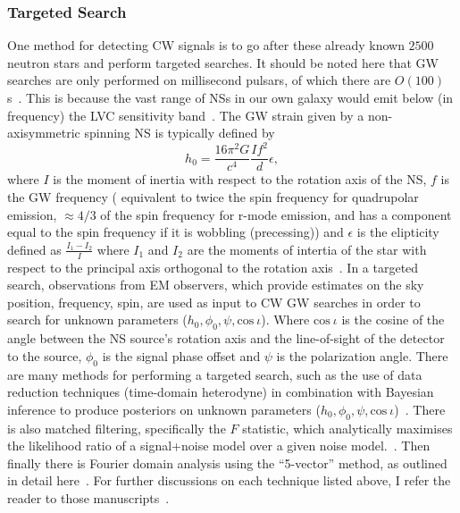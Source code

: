 \subsubsection{Targeted Search}
One method for detecting 
\ac{CW} signals is to go after these already known $2500$ neutron 
stars and perform targeted searches. It should be noted here 
that \ac{GW} searches are only performed on millisecond pulsars, of which 
there are $O(100)$s~\cite{1712.05897}. This is because the vast 
range of \ac{NS}s in our own galaxy would emit below 
(in frequency) the \ac{LVC} sensitivity band~\cite{2020ApJ...902L..21A}.
The GW strain given by a non-axisymmetric spinning 
\ac{NS} is typically defined by 
%
\begin{equation}
    h_{0} = \frac{16\pi^2G}{c^4} \frac{I f^2}{d} \epsilon,
\end{equation}
%
where $I$ is the moment of inertia with respect to the rotation axis 
of the \ac{NS}, $f$ is the \ac{GW} frequency (
equivalent to twice the spin frequency for quadrupolar emission, 
$\approx 4/3$ of the spin frequency for r-mode emission, and has a 
component equal to the spin frequency if it is wobbling (precessing)) 
and $\epsilon$ is the elipticity 
defined as $\frac{I_1 - I_2}{I}$ where $I_1$ and $I_2$ are the moments 
of intertia of the star with respect to the principal axis orthogonal to the 
rotation axis~\cite{1998PhRvD..58f3001J}. In a targeted search, observations 
from \ac{EM} observers, which provide estimates on the sky position, 
frequency, spin, are used as input to \ac{CW} \ac{GW} searches in order to 
search for unknown parameters ($h_0,\phi_0,\psi,\mathrm{cos} \ \iota$).
Where $\mathrm{cos} \ \iota$ is the cosine of the angle between the \ac{NS} 
source's rotation axis and the line-of-sight of the detector to the 
source, $\phi_0$ is the signal phase offset and $\psi$ is the polarization 
angle.  There are many methods for performing a 
targeted search, such as the use of data reduction techniques 
(time-domain heterodyne) in combination with Bayesian inference to 
produce posteriors on unknown parameters 
($h_0,\phi_0,\psi,\mathrm{cos} \ \iota$)~\cite{PhysRevD.72.102002}. There 
is also 
matched filtering, specifically the $F$ statistic, which analytically 
maximises the likelihood ratio of a signal+noise model over a 
given noise model.~\cite{PhysRevD.58.063001}. Then finally 
there is Fourier domain 
analysis using the ``5-vector'' method, as outlined in 
detail here~\cite{Astone_2010}. For further discussions 
on each technique listed above, I refer the reader to those
manuscripts~\cite{PhysRevD.72.102002,PhysRevD.58.063001,Astone_2010}.

